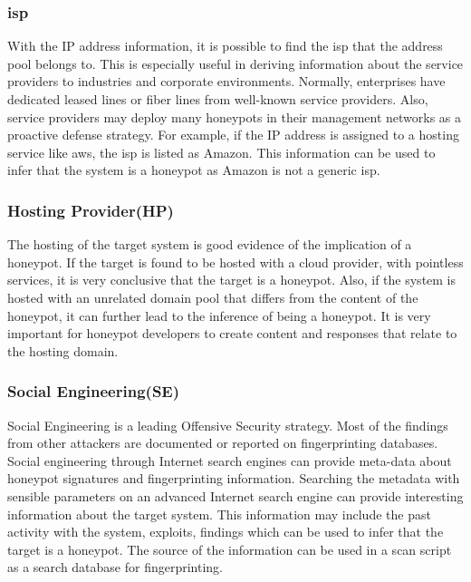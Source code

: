\subsubsection{\acrfull{isp}}
With the IP address information, it is possible to find the \acrshort{isp} that the address pool belongs to. This is especially useful in deriving information about the service providers to industries and corporate environments. Normally, enterprises have dedicated leased lines or fiber lines from well-known service providers. Also, service providers may deploy many honeypots in their management networks as a proactive defense strategy. For example, if the IP address is assigned to a hosting service like \acrshort{aws}, the \acrshort{isp} is listed as Amazon. This information can be used to infer that the system is a honeypot as Amazon is not a generic \acrshort{isp}. 

\subsubsection{Hosting Provider(HP)}
The hosting of the target system is good evidence of the implication of a honeypot. If the target is found to be hosted with a cloud provider, with pointless services, it is very conclusive that the target is a honeypot. Also, if the system is hosted with an unrelated domain pool that differs from the content of the honeypot, it can further lead to the inference of being a honeypot. It is very important for honeypot developers to create content and responses that relate to the hosting domain. 

\subsubsection{Social Engineering(SE)}
Social Engineering is a leading Offensive Security strategy. Most of the findings from other attackers are documented or reported on fingerprinting databases. Social engineering through Internet search engines can provide meta-data about honeypot signatures and fingerprinting information. Searching the metadata with sensible parameters on an advanced Internet search engine can provide interesting information about the target system. This information may include the past activity with the system, exploits, findings which can be used to infer that the target is a honeypot. The source of the information can be used in a scan script as a search database for fingerprinting. 

